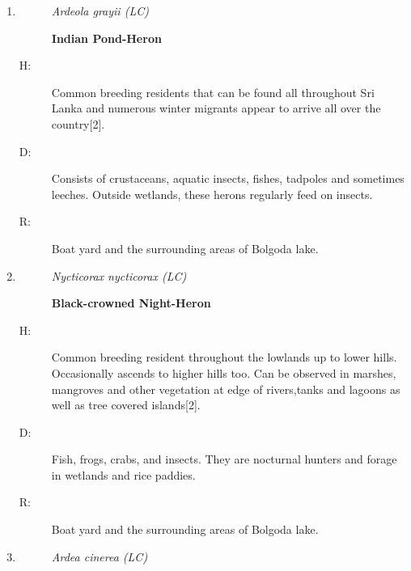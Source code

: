 \begin{itemize}
\begin{enumerate}
%
\item%
\begin{description}%
\item[]%
\textit{Ardeola grayii (LC)}%
\item[]%
\textbf{Indian Pond{-}Heron}%
\end{description}%
\begin{description}%
\item[H: ]%
 Common breeding residents that can be found all throughout Sri Lanka and numerous winter migrants appear to arrive all over the country{[}2{]}.%
\item[D: ]%
Consists of crustaceans, aquatic insects, fishes, tadpoles and sometimes leeches. Outside wetlands, these herons regularly feed on insects.%
\item[R: ]%
Boat yard and the surrounding areas of Bolgoda lake.%
\end{description}%
\item%
\begin{description}%
\item[]%
\textit{Nycticorax nycticorax (LC)}%
\item[]%
\textbf{Black{-}crowned Night{-}Heron}%
\end{description}%
\begin{description}%
\item[H: ]%
Common breeding resident throughout the lowlands  up to lower hills. Occasionally ascends to higher hills too. Can be observed in marshes, mangroves and other vegetation at edge of rivers,tanks and lagoons as well as tree covered islands{[}2{]}.%
\item[D: ]%
Fish, frogs, crabs, and insects. They are nocturnal hunters and forage in wetlands and rice paddies.%
\item[R: ]%
Boat yard and the surrounding areas of Bolgoda lake.%
\end{description}%
\item%
\begin{description}%
\item[]%
\textit{Ardea cinerea (LC)}%
\item[]%

\end{description}
\end{enumerate}
\end{itemize}

